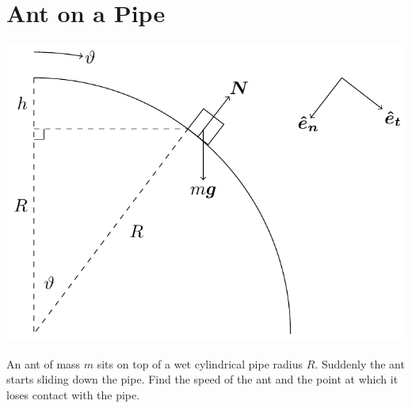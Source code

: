 \documentclass{article}
\begin{document}
\section{Ant on a Pipe}

\begin{center}
\includegraphics[scale=0.3]{AntOnPipe}
\end{center}

An ant of mass \(m\) sits on top of a wet cylindrical pipe radius \(R\). Suddenly the ant starts sliding down the pipe. Find the speed of the ant and the point at which it loses contact with the pipe.
\end{document}
